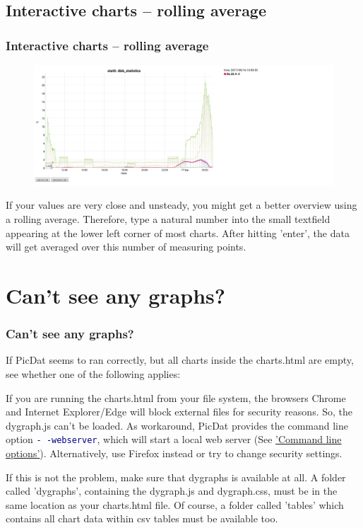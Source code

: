 \documentclass[8pt]{beamer}
\begin{document}
\subsection{Interactive charts -- rolling average}
\begin{frame}
\frametitle{Interactive charts -- rolling average} 
\begin{figure}
	\includegraphics[width=\textwidth]{../images/PicDat_roller.png}
\end{figure}

If your values are very close and unsteady, you might get a better overview using a rolling average. Therefore, type a natural number into the small textfield appearing at the lower left corner of most charts. After hitting 'enter', the data will get averaged over this number of measuring points.
\end{frame}

\section{Can't see any graphs?}
\begin{frame}
\frametitle{Can't see any graphs?}
If PicDat seems to ran correctly, but all charts inside the charts.html are empty, see whether one of the following applies:
\bigskip

If you are running the charts.html from your file system, the browsers Chrome and Internet Explorer/Edge will block external files for security reasons. So, the dygraph.js can't be loaded. As workaround, PicDat provides the command line option \textcolor{darkblue}{\texttt{-\,-webserver}}, which will start a local web server (See \hyperref[options]{'Command line options'}). Alternatively, use Firefox instead or try to change security settings.
\bigskip

If this is not the problem, make sure that dygraphs is available at all. A folder called 'dygraphs', containing the dygraph.js and dygraph.css, must be in the same location as your charts.html file. Of course, a folder called 'tables' which contains all chart data within csv tables must be available too.
\end{frame}
\end{document}
